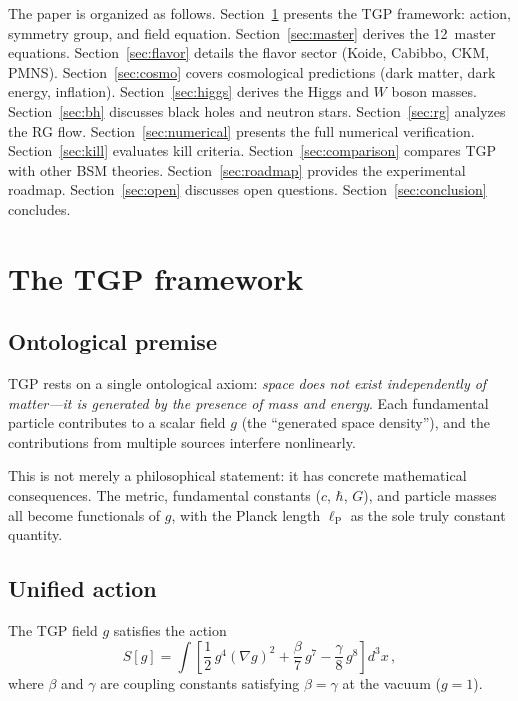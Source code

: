 \documentclass[aps,prd,twocolumn,superscriptaddress,showpacs,
  nofootinbib,floatfix,longbibliography]{revtex4-2}
\newcommand{\lP}{\ell_\mathrm{P}}
\begin{document}
The paper is organized as follows.
Section~\ref{sec:framework} presents the TGP framework: action,
symmetry group, and field equation.
Section~\ref{sec:master} derives the 12~master equations.
Section~\ref{sec:flavor} details the flavor sector (Koide, Cabibbo,
CKM, PMNS).
Section~\ref{sec:cosmo} covers cosmological predictions (dark matter,
dark energy, inflation).
Section~\ref{sec:higgs} derives the Higgs and $W$ boson masses.
Section~\ref{sec:bh} discusses black holes and neutron stars.
Section~\ref{sec:rg} analyzes the RG flow.
Section~\ref{sec:numerical} presents the full numerical verification.
Section~\ref{sec:kill} evaluates kill criteria.
Section~\ref{sec:comparison} compares TGP with other BSM theories.
Section~\ref{sec:roadmap} provides the experimental roadmap.
Section~\ref{sec:open} discusses open questions.
Section~\ref{sec:conclusion} concludes.


\section{The TGP framework}\label{sec:framework}

\subsection{Ontological premise}\label{ssec:ontology}

TGP rests on a single ontological axiom:
\emph{space does not exist independently of matter---it is generated by
the presence of mass and energy}. Each fundamental particle contributes
to a scalar field $g$ (the ``generated space density''), and the
contributions from multiple sources interfere nonlinearly.

This is not merely a philosophical statement: it has concrete mathematical
consequences. The metric, fundamental constants ($c$, $\hbar$, $G$), and
particle masses all become functionals of $g$, with the Planck length
$\lP$ as the sole truly constant quantity.

\subsection{Unified action}\label{ssec:action}

The TGP field $g$ satisfies the action
\begin{equation}\label{eq:action}
  S[g] = \int\!\left[
    \frac{1}{2}\,g^4(\nabla g)^2
    + \frac{\beta}{7}\,g^7
    - \frac{\gamma}{8}\,g^8
  \right] d^3x\,,
\end{equation}
where $\beta$ and $\gamma$ are coupling constants satisfying
$\beta = \gamma$ at the vacuum ($g = 1$).
\end{document}
